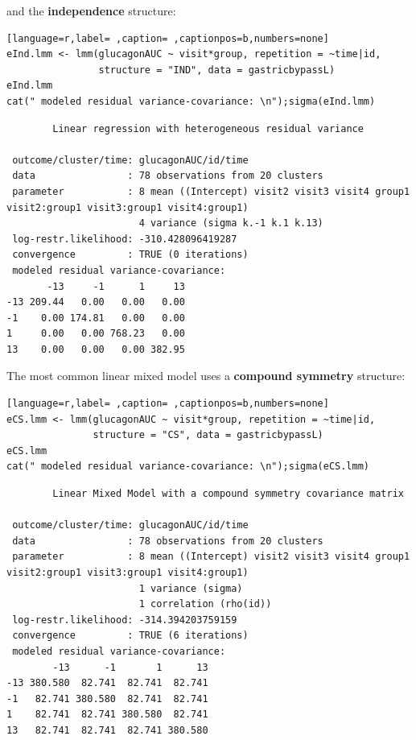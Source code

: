 \documentclass[12pt]{article}
\begin{document}
and the \textbf{independence} structure:
\begin{lstlisting}[language=r,label= ,caption= ,captionpos=b,numbers=none]
eInd.lmm <- lmm(glucagonAUC ~ visit*group, repetition = ~time|id, 
                structure = "IND", data = gastricbypassL)
eInd.lmm
cat(" modeled residual variance-covariance: \n");sigma(eInd.lmm)
\end{lstlisting}

\begin{verbatim}
		Linear regression with heterogeneous residual variance 

 outcome/cluster/time: glucagonAUC/id/time 
 data                : 78 observations from 20 clusters 
 parameter           : 8 mean ((Intercept) visit2 visit3 visit4 group1 visit2:group1 visit3:group1 visit4:group1) 
                       4 variance (sigma k.-1 k.1 k.13) 
 log-restr.likelihood: -310.428096419287 
 convergence         : TRUE (0 iterations)
 modeled residual variance-covariance: 
       -13     -1      1     13
-13 209.44   0.00   0.00   0.00
-1    0.00 174.81   0.00   0.00
1     0.00   0.00 768.23   0.00
13    0.00   0.00   0.00 382.95
\end{verbatim}

\clearpage

The most common linear mixed model uses a \textbf{compound symmetry} structure:
\begin{lstlisting}[language=r,label= ,caption= ,captionpos=b,numbers=none]
eCS.lmm <- lmm(glucagonAUC ~ visit*group, repetition = ~time|id,
               structure = "CS", data = gastricbypassL)
eCS.lmm
cat(" modeled residual variance-covariance: \n");sigma(eCS.lmm)
\end{lstlisting}

\begin{verbatim}
		Linear Mixed Model with a compound symmetry covariance matrix 

 outcome/cluster/time: glucagonAUC/id/time 
 data                : 78 observations from 20 clusters 
 parameter           : 8 mean ((Intercept) visit2 visit3 visit4 group1 visit2:group1 visit3:group1 visit4:group1) 
                       1 variance (sigma) 
                       1 correlation (rho(id)) 
 log-restr.likelihood: -314.394203759159 
 convergence         : TRUE (6 iterations)
 modeled residual variance-covariance: 
        -13      -1       1      13
-13 380.580  82.741  82.741  82.741
-1   82.741 380.580  82.741  82.741
1    82.741  82.741 380.580  82.741
13   82.741  82.741  82.741 380.580
\end{verbatim}
\end{document}
